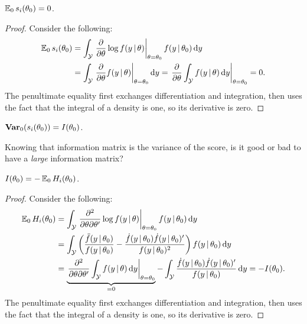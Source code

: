 \documentclass[a4paper,12pt]{article}
\begin{document}
\begin{proposition}
	$\operatorname{\mathbb{E}}_0 s_i(\theta_0)=0$.
\end{proposition}
\begin{proof}
	Consider the following:
	\begin{align*}
		\operatorname{\mathbb{E}}_0 s_i(\theta_0)
		&= \int_{\mathcal{Y}} \left.\frac{\partial}{\partial\theta}\log f(y\mathpunct{}|\mathpunct{}\theta)\right|_{\theta=\theta_0} f(y\mathpunct{}|\mathpunct{}\theta_0)\mathop{}\!{\mathrm{d}} y \\
		&= \int_{\mathcal{Y}} \left.\frac{\partial}{\partial\theta} f(y\mathpunct{}|\mathpunct{}\theta)\right|_{\theta=\theta_0} \mathop{}\!{\mathrm{d}} y
		= \left.\frac{\partial}{\partial\theta}\int_{\mathcal{Y}} f(y\mathpunct{}|\mathpunct{}\theta)\mathop{}\!{\mathrm{d}} y\right|_{\theta=\theta_0}
		= 0.
		\qedhere
	\end{align*}
	The penultimate equality
	first exchanges differentiation and integration,
	then uses the fact that the integral of a density is one, so its derivative is zero.
\end{proof}

\begin{corollary}
	$\operatorname{\text{\textrm{\upshape\textbf{Var}}}}_0(s_i(\theta_0))=I(\theta_0)$.
\end{corollary}

\begin{question}\label{question-1}
	Knowing that information matrix is the variance of the score,
	is it good or bad to have a \emph{large} information matrix?
\end{question}

\begin{theorem}\label{thm-information-equality}
	$I(\theta_0)=-\operatorname{\mathbb{E}}_0 H_i(\theta_0)$.
\end{theorem}
\begin{proof}
	Consider the following:
	\begin{align}
		\operatorname{\mathbb{E}}_0 H_i(\theta_0)
		&= \int_{\mathcal{Y}} \left.\frac{\partial^2}{\partial\theta\partial\theta^{\prime}}\log f(y\mathpunct{}|\mathpunct{}\theta)\right|_{\theta=\theta_0} f(y\mathpunct{}|\mathpunct{}\theta_0)\mathop{}\!{\mathrm{d}} y \\
		&= \int_{\mathcal{Y}} \left(\frac{\ddot f(y\mathpunct{}|\mathpunct{}\theta_0)}{f(y\mathpunct{}|\mathpunct{}\theta_0)} - \frac{\dot f(y\mathpunct{}|\mathpunct{}\theta_0)\dot f(y\mathpunct{}|\mathpunct{}\theta_0)^{\prime}}{f(y\mathpunct{}|\mathpunct{}\theta_0)^2}\right) f(y\mathpunct{}|\mathpunct{}\theta_0)\mathop{}\!{\mathrm{d}} y \\
		&= \underbrace{\left.\frac{\partial^2}{\partial\theta\partial\theta^{\prime}}\int_{\mathcal{Y}} f(y\mathpunct{}|\mathpunct{}\theta)\mathop{}\!{\mathrm{d}} y\right|_{\theta=\theta_0}}_{=0}
		- \int_{\mathcal{Y}} \frac{\dot f(y\mathpunct{}|\mathpunct{}\theta_0)\dot f(y\mathpunct{}|\mathpunct{}\theta_0)^{\prime}}{f(y\mathpunct{}|\mathpunct{}\theta_0)}\mathop{}\!{\mathrm{d}} y
		= - I(\theta_0).
	\end{align}
	The penultimate equality
	first exchanges differentiation and integration,
	then uses the fact that the integral of a density is one, so its derivative is zero.
\end{proof}
\end{document}
